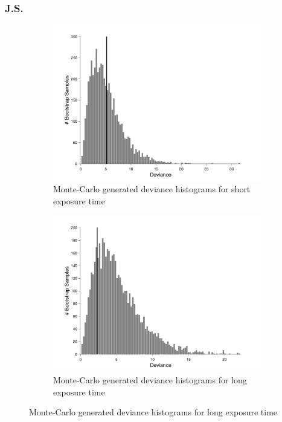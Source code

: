 \documentclass{article}
\begin{document}
\subsubsection*{J.S.}
\begin{figure}[!hb]
    \begin{subfigure}{0.494\linewidth}
        \centering
        \includegraphics[width = \linewidth]{Thesis/plots/gof/cutNo/cutNo_js_short_bootstrap.png}
        \caption{Monte-Carlo generated deviance histograms for short exposure time}
        \label{fig:da_gof_short_bootstrap}
    \end{subfigure}
    \hspace{0.01\textwidth}
    \begin{subfigure}{0.494\linewidth}
        \centering
        \includegraphics[width = \linewidth]{Thesis/plots/gof/cutNo/cutNo_js_long_bootstrap.png}
        \caption{Monte-Carlo generated deviance histograms for long exposure time}
        \label{fig:da_gof_long_bootstrap}
    \end{subfigure}
    

\end{figure}
\end{document}
